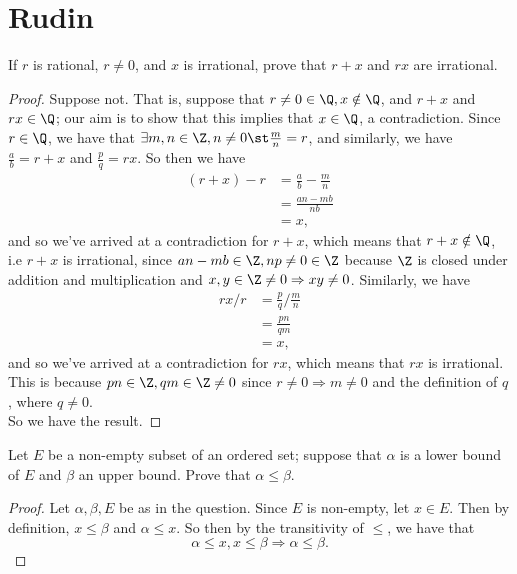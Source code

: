 \documentclass{assignment}
\begin{document}

\section*{Rudin}
\begin{question}[1]
  If $r$ is rational, $r\neq 0$, and $x$ is irrational, prove that $r+x$ and $rx$ are irrational.
\end{question}
\begin{proof}
  Suppose not. That is, suppose that $r\neq 0\in\Q, x\notin\Q$, and $r+x$ and $rx\in\Q$; our aim is to
  show that this implies that $x\in\Q$, a contradiction. Since $r\in\Q$, we have that $\exists m,n
  \in\Z, n\neq 0 \st \frac{m}{n} = r$, and similarly, we have $\frac{a}{b} = r + x$ and $\frac{p}{q}
  = rx$. So then we have 
  \begin{align*}
    (r + x) - r &= \frac{a}{b} - \frac{m}{n} \\
                &= \frac{an - mb}{nb} \\
                &= x, 
  \end{align*}
  and so we've arrived at a contradiction for $r+x$, which means that $r+x\notin\Q$, i.e $r+x$ is irrational,
  since $an-mb \in \Z, np\neq 0\in\Z$ because $\Z$ is closed under addition and multiplication and 
  $x,y\in\Z \neq 0 \Rightarrow xy\neq 0$. Similarly, we have
  \begin{align*}
    rx / r &= \frac{p}{q} / \frac{m}{n} \\
           &= \frac{pn}{qm} \\
           &= x,
  \end{align*}
  and so we've arrived at a contradiction for $rx$, which means that $rx$ is irrational. This is because
  $pn\in\Z, qm\in\Z\neq 0$ since $r\neq 0 \Rightarrow m\neq 0$ and the definition of $q$, where $q\neq 0$.\\

  So we have the result.
\end{proof}

\begin{question}[4]
  Let $E$ be a non-empty subset of an ordered set; suppose that $\alpha$ is a lower bound of $E$ and
$\beta$ an upper bound. Prove that $\alpha\leq\beta$.
\end{question}
\begin{proof}
  Let $\alpha, \beta, E$ be as in the question. Since $E$ is non-empty, let $x\in E$. Then by definition,
  $x\leq\beta$ and $\alpha\leq x$. So then by the transitivity of $\leq$, we have that 
  $$\alpha\leq x, x\leq\beta \Rightarrow \alpha\leq\beta.$$
\end{proof}
\end{document}
